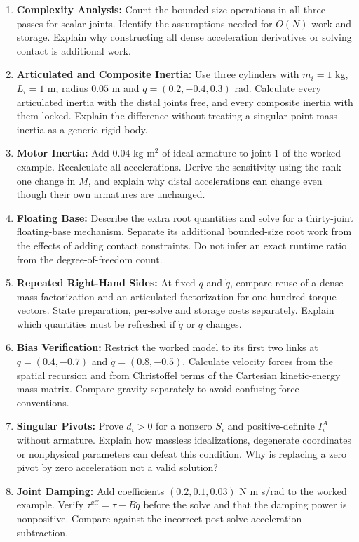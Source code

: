 \begin{enumerate}
\item \textbf{Complexity Analysis:} Count the bounded-size operations in all three passes for scalar joints. Identify the assumptions needed for $O(N)$ work and storage. Explain why constructing all dense acceleration derivatives or solving contact is additional work.
\item \textbf{Articulated and Composite Inertia:} Use three cylinders with $m_i=1$ kg, $L_i=1$ m, radius $0.05$ m and $q=(0.2,-0.4,0.3)$ rad. Calculate every articulated inertia with the distal joints free, and every composite inertia with them locked. Explain the difference without treating a singular point-mass inertia as a generic rigid body.
\item \textbf{Motor Inertia:} Add $0.04$ kg m$^2$ of ideal armature to joint 1 of the worked example. Recalculate all accelerations. Derive the sensitivity using the rank-one change in $M$, and explain why distal accelerations can change even though their own armatures are unchanged.
\item \textbf{Floating Base:} Describe the extra root quantities and solve for a thirty-joint floating-base mechanism. Separate its additional bounded-size root work from the effects of adding contact constraints. Do not infer an exact runtime ratio from the degree-of-freedom count.
\item \textbf{Repeated Right-Hand Sides:} At fixed $q$ and $\dot q$, compare reuse of a dense mass factorization and an articulated factorization for one hundred torque vectors. State preparation, per-solve and storage costs separately. Explain which quantities must be refreshed if $\dot q$ or $q$ changes.
\item \textbf{Bias Verification:} Restrict the worked model to its first two links at $q=(0.4,-0.7)$ and $\dot q=(0.8,-0.5)$. Calculate velocity forces from the spatial recursion and from Christoffel terms of the Cartesian kinetic-energy mass matrix. Compare gravity separately to avoid confusing force conventions.
\item \textbf{Singular Pivots:} Prove $d_i>0$ for a nonzero $S_i$ and positive-definite $I_i^A$ without armature. Explain how massless idealizations, degenerate coordinates or nonphysical parameters can defeat this condition. Why is replacing a zero pivot by zero acceleration not a valid solution?
\item \textbf{Joint Damping:} Add coefficients $(0.2,0.1,0.03)$ N m s/rad to the worked example. Verify $\tau^{\mathrm{eff}}=\tau-B\dot q$ before the solve and that the damping power is nonpositive. Compare against the incorrect post-solve acceleration subtraction.

\end{enumerate}
